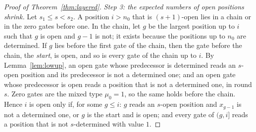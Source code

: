 \documentclass[11pt]{amsart}
\theoremstyle{definition}
\theoremstyle{remark}
\begin{document}
\begin{proof}[Proof of Theorem~\ref{thm:layered}]
\emph{Step 3: the expected numbers of open positions shrink.} Let $s_1\le s<s_2$. A position
$i>n_0$ that is $(s+1)$-open lies in a chain or in the zero gates before one. In the chain,
let $g$ be the largest position up to $i$ such that $g$ is open and $g-1$ is not; it exists
because the positions up to $n_0$ are determined. If $g$ lies before the first gate of the chain,
then the gate before the chain, the \emph{start}, is open, and so is every gate of the chain up
to $i$. By Lemma~\ref{lem:lowup}, an open
gate whose predecessor is determined reads an $s$-open position and its predecessor is not a
determined one; and an open gate whose predecessor is open reads a position that is not a
determined one, in round $s$. Zero gates are the mixed type $\mu_0=1$, so the same holds before the
chain. Hence $i$ is open only if, for some $g\le i$: $g$ reads an $s$-open position and $x_{g-1}$
is not a determined one, or $g$ is the start and is open; and every gate of $(g,i]$ reads a
position that is not $s$-determined with value $1$.


\end{proof}
\end{document}
